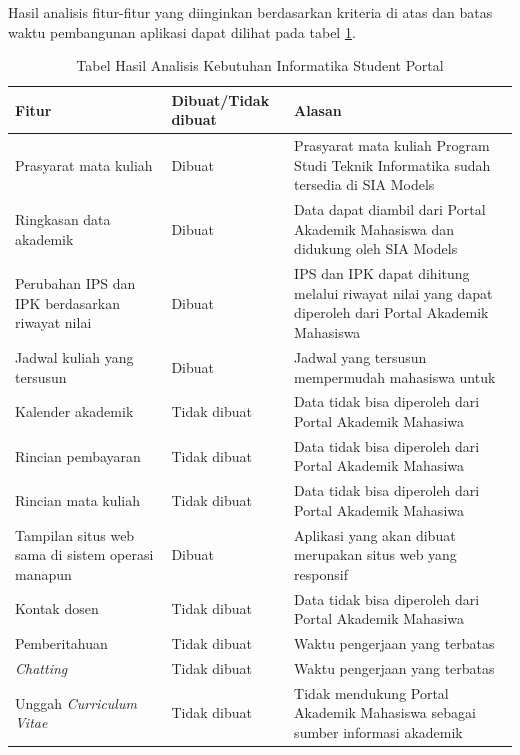 Hasil analisis fitur-fitur yang diinginkan berdasarkan kriteria di atas dan batas waktu pembangunan aplikasi dapat dilihat pada tabel \ref{tab:3_hasil_fitur}.
\begin{table}[H]
	\centering
    \begin{tabular}{|p{4.5cm}|p{2.5cm}|p{8cm}|}
		\hline
		\hline
		Fitur & Dibuat/Tidak dibuat & Alasan\\
		\hline
		Prasyarat mata kuliah                             & Dibuat       & Prasyarat mata kuliah Program Studi Teknik Informatika sudah tersedia di SIA Models                   \\
		\hline
    Ringkasan data akademik                               & Dibuat       & Data dapat diambil dari Portal Akademik Mahasiswa dan didukung oleh SIA Models                        \\
		\hline
    Perubahan IPS dan IPK berdasarkan riwayat nilai   & Dibuat       &  IPS dan IPK dapat dihitung melalui riwayat nilai yang dapat diperoleh dari Portal Akademik Mahasiswa \\
		\hline
    Jadwal kuliah yang tersusun                       & Dibuat       & Jadwal yang tersusun mempermudah mahasiswa untuk                                                      \\
		\hline
    Kalender akademik                                 & Tidak dibuat & Data tidak bisa diperoleh dari Portal Akademik Mahasiwa                                               \\
		\hline
    Rincian pembayaran                                & Tidak dibuat & Data tidak bisa diperoleh dari Portal Akademik Mahasiwa                                               \\
		\hline
    Rincian mata kuliah                               & Tidak dibuat & Data tidak bisa diperoleh dari Portal Akademik Mahasiwa                                               \\
		\hline
    Tampilan situs web sama di sistem operasi manapun & Dibuat       & Aplikasi yang akan dibuat merupakan situs web yang responsif                                          \\
		\hline
    Kontak dosen                                      & Tidak dibuat & Data tidak bisa diperoleh dari Portal Akademik Mahasiwa                                               \\
		\hline
    Pemberitahuan                                     & Tidak dibuat & Waktu pengerjaan yang terbatas                                                                        \\
		\hline
    \textit{Chatting}                                          & Tidak dibuat & Waktu pengerjaan yang terbatas                                                                        \\
		\hline
    Unggah \textit{Curriculum Vitae}                           & Tidak dibuat & Tidak mendukung Portal Akademik Mahasiswa sebagai sumber informasi akademik                           \\
		\hline
		\end{tabular}
		\caption{Tabel Hasil Analisis Kebutuhan Informatika Student Portal}
	\label{tab:3_hasil_fitur}
\end{table}


